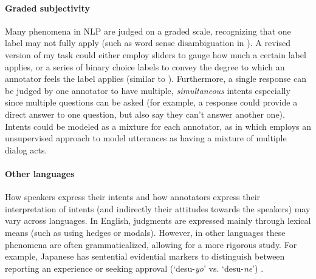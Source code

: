 \paragraph{Graded subjectivity}
Many phenomena in NLP are judged on a graded scale, recognizing that one label may not fully apply (such as word sense disambiguation in ). A revised version of my task could either employ sliders to gauge how much a certain label applies, or a series of binary choice labels to convey the degree to which an annotator feels the label applies (similar to ). Furthermore, a single response can be judged by one annotator to have multiple, \emph{simultaneous} intents especially since multiple questions can be asked (for example, a response could provide a direct answer to one question, but also say they can't answer another one). Intents could be modeled as a mixture for each annotator, as in  which employs an unsupervised approach to model utterances as having a mixture of multiple dialog acts.

\paragraph{Other languages}
How speakers express their intents and how annotators express their interpretation of intents (and indirectly their attitudes towards the speakers) may vary across languages. In English, judgments are expressed mainly through lexical means (such as using hedges or modals). However, in other languages these phenomena are often grammaticalized, allowing for a more rigorous study. For example, Japanese has sentential evidential markers to distinguish between reporting an experience or seeking approval (`desu-\textit{yo}' vs. `desu-\textit{ne}') \cite{Stojanovic:2019}. %

